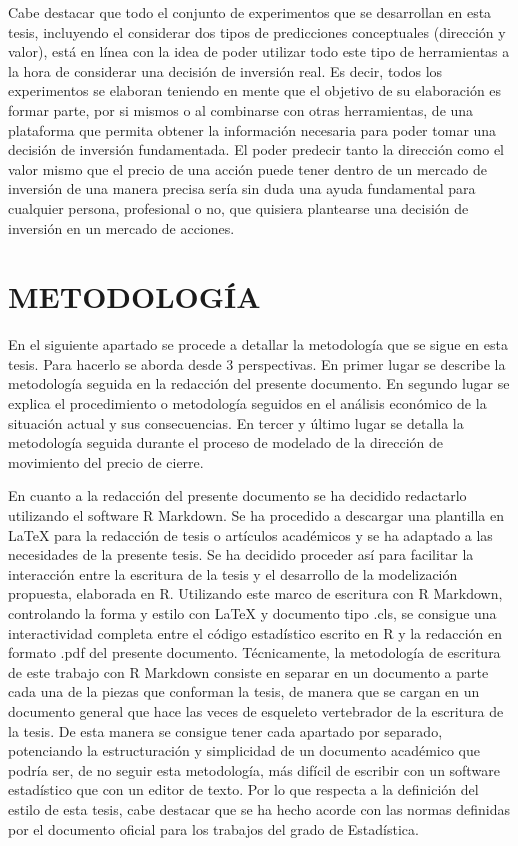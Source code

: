 \documentclass[]{DissertateUSU}
\begin{document}
\noindent Cabe destacar que todo el conjunto de experimentos que se
desarrollan en esta tesis, incluyendo el considerar dos tipos de
predicciones conceptuales (dirección y valor), está en línea con la idea
de poder utilizar todo este tipo de herramientas a la hora de considerar
una decisión de inversión real. Es decir, todos los experimentos se
elaboran teniendo en mente que el objetivo de su elaboración es formar
parte, por si mismos o al combinarse con otras herramientas, de una
plataforma que permita obtener la información necesaria para poder tomar
una decisión de inversión fundamentada. El poder predecir tanto la
dirección como el valor mismo que el precio de una acción puede tener
dentro de un mercado de inversión de una manera precisa sería sin duda
una ayuda fundamental para cualquier persona, profesional o no, que
quisiera plantearse una decisión de inversión en un mercado de acciones.

\newpage
{}
\fancyhead[R]{\thepage}
\fancyfoot[C]{}

\chapter{\textbf{METODOLOGÍA}}

\noindent En el siguiente apartado se procede a detallar la metodología
que se sigue en esta tesis. Para hacerlo se aborda desde 3 perspectivas.
En primer lugar se describe la metodología seguida en la redacción del
presente documento. En segundo lugar se explica el procedimiento o
metodología seguidos en el análisis económico de la situación actual y
sus consecuencias. En tercer y último lugar se detalla la metodología
seguida durante el proceso de modelado de la dirección de movimiento del
precio de cierre.

\noindent En cuanto a la redacción del presente documento se ha decidido
redactarlo utilizando el software R Markdown. Se ha procedido a
descargar una plantilla en LaTeX para la redacción de tesis o artículos
académicos y se ha adaptado a las necesidades de la presente tesis. Se
ha decidido proceder así para facilitar la interacción entre la
escritura de la tesis y el desarrollo de la modelización propuesta,
elaborada en R. Utilizando este marco de escritura con R Markdown,
controlando la forma y estilo con LaTeX y documento tipo .cls, se
consigue una interactividad completa entre el código estadístico escrito
en R y la redacción en formato .pdf del presente documento.
Técnicamente, la metodología de escritura de este trabajo con R Markdown
consiste en separar en un documento a parte cada una de la piezas que
conforman la tesis, de manera que se cargan en un documento general que
hace las veces de esqueleto vertebrador de la escritura de la tesis. De
esta manera se consigue tener cada apartado por separado, potenciando la
estructuración y simplicidad de un documento académico que podría ser,
de no seguir esta metodología, más difícil de escribir con un software
estadístico que con un editor de texto. Por lo que respecta a la
definición del estilo de esta tesis, cabe destacar que se ha hecho
acorde con las normas definidas por el documento oficial para los
trabajos del grado de Estadística.
\end{document}
